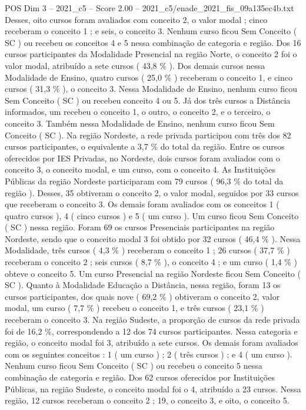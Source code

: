 \begin{textsample}{POS Dim 3 – 2021\_c5 – Score 2.00 – 2021\_c5/enade\_2021\_fis\_09a135ec4b.txt}
Desses, oito cursos foram avaliados com conceito 2, o valor modal ; cinco receberam o conceito 1 ; e seis, o conceito 3.
Nenhum curso ficou Sem Conceito ( SC ) ou recebeu os conceitos 4 e 5 nessa combinação de categoria e região.
Dos 16 cursos participantes da Modalidade Presencial na região Norte, o conceito 2 foi o valor modal, atribuído a sete cursos ( 43,8 \% ).
Dos demais cursos nessa Modalidade de Ensino, quatro cursos ( 25,0 \% ) receberam o conceito 1, e cinco cursos ( 31,3 \% ), o conceito 3.
Nessa Modalidade de Ensino, nenhum curso ficou Sem Conceito ( SC ) ou recebeu conceito 4 ou 5.
Já dos três cursos a Distância informados, um recebeu o conceito 1, o outro, o conceito 2, e o terceiro, o conceito 3.
Também nessa Modalidade de Ensino, nenhum curso ficou Sem Conceito ( SC ).
Na região Nordeste, a rede privada participou com três dos 82 cursos participantes, o equivalente a 3,7 \% do total da região.
Entre os cursos oferecidos por IES Privadas, no Nordeste, dois cursos foram avaliados com o conceito 3, o conceito modal, e um curso, com o conceito 4.
As Instituições Públicas da região Nordeste participaram com 79 cursos ( 96,3 \% do total da região ).
Desses, 35 obtiveram o conceito 2, o valor modal, seguidos por 33 cursos que receberam o conceito 3.
Os demais foram avaliados com os conceitos 1 ( quatro cursos ), 4 ( cinco cursos ) e 5 ( um curso ).
Um curso ficou Sem Conceito ( SC ) nessa região.
Foram 69 os cursos Presenciais participantes na região Nordeste, sendo que o conceito modal 3 foi obtido por 32 cursos ( 46,4 \% ).
Nessa Modalidade, três cursos ( 4,3 \% ) receberam o conceito 1 ; 26 cursos ( 37,7 \% ) receberam o conceito 2 ; seis cursos ( 8,7 \% ), o conceito 4 ; e um curso ( 1,4 \% ) obteve o conceito 5.
Um curso Presencial na região Nordeste ficou Sem Conceito ( SC ).
Quanto à Modalidade Educação a Distância, nessa região, foram 13 os cursos participantes, dos quais nove ( 69,2 \% ) obtiveram o conceito 2, valor modal, um curso ( 7,7 \% ) recebeu o conceito 1, e três cursos ( 23,1 \% ) receberam o conceito 3.
Na região Sudeste, a proporção de cursos da rede privada foi de 16,2 \%, correspondendo a 12 dos 74 cursos participantes.
Nessa categoria e região, o conceito modal foi 3, atribuído a sete cursos.
Os demais foram avaliados com os seguintes conceitos : 1 ( um curso ) ; 2 ( três cursos ) ; e 4 ( um curso ).
Nenhum curso ficou Sem Conceito ( SC ) ou recebeu o conceito 5 nessa combinação de categoria e região.
Dos 62 cursos oferecidos por Instituições Públicas, na região Sudeste, o conceito modal foi o 4, atribuído a 23 cursos.
Nessa região, 12 cursos receberam o conceito 2 ; 19, o conceito 3, e oito, o conceito 5.

\end{textsample}

